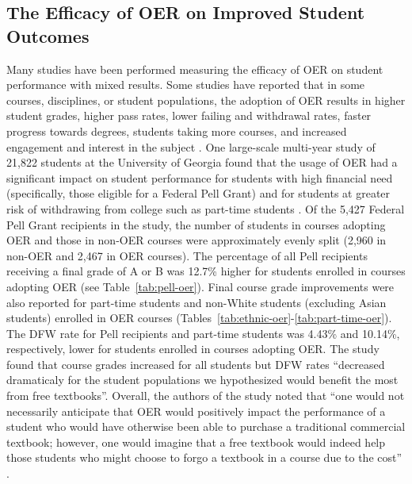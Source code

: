\documentclass[11pt]{article}
\begin{document}
\subsection{The Efficacy of OER on Improved Student Outcomes}
Many studies have been performed measuring the efficacy of OER on student performance with mixed results.  Some studies have reported that in some courses, disciplines, or student populations, the adoption of OER results in higher student grades, higher pass rates, lower failing and withdrawal rates, faster progress towards degrees, students taking more courses, and increased engagement and interest in the subject \cite{MC:17, AF-MM:12, KG-WD:17, RG-JM-SW:22, JH-CL:12, JH-LF-DW:16, RJ-FD-RL-KP:18, OO-CH:17, NP-DB:13, RF-RP-BD:15, LF-JH:15, RP:15, TR:15, CB-WC-PH:18}.  One large-scale multi-year study of 21,822 students at the University of Georgia found that the usage of OER had a significant impact on student performance for students with high financial need (specifically, those eligible for a Federal Pell Grant) and for students at greater risk of withdrawing from college such as part-time students \cite{CB-WC-PH:18}.  Of the 5,427 Federal Pell Grant recipients in the study, the number of students in courses adopting OER and those in non-OER courses were approximately evenly split (2,960 in non-OER and 2,467 in OER courses).  The percentage of all Pell recipients receiving a final grade of A or B was 12.7\% higher for students enrolled in courses adopting OER (see Table~\ref{tab:pell-oer}).  Final course grade improvements were also reported for part-time students and non-White students (excluding Asian students) enrolled in OER courses (Tables~\ref{tab:ethnic-oer}-\ref{tab:part-time-oer}).  The DFW rate for Pell recipients and part-time students was 4.43\% and 10.14\%, respectively, lower for students enrolled in courses adopting OER. The study found that course grades increased for all students but DFW rates ``decreased dramaticaly for the student populations we hypothesized would benefit the most from free textbooks''. Overall, the authors of the study noted that ``one would not necessarily anticipate that OER would positively impact the performance of a student who would have otherwise been able to purchase a traditional commercial textbook; however, one would imagine that a free textbook would indeed help those students who might choose to forgo a textbook in a course due to the cost'' \cite{CB-WC-PH:18}.
\end{document}
